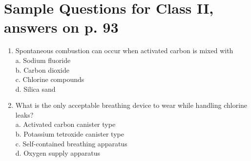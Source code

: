\documentclass[10pt]{article}
\begin{document}
\section{Sample Questions for Class II, answers on p. 93}
\begin{enumerate}
  \item Spontaneous combustion can occur when activated carbon is mixed with\\
a. Sodium fluoride\\
b. Carbon dioxide\\
c. Chlorine compounds\\
d. Silica sand

  \item What is the only acceptable breathing device to wear while handling chlorine leaks?\\
a. Activated carbon canister type\\
b. Potassium tetroxide canister type\\
c. Self-contained breathing apparatus\\
d. Oxygen supply apparatus

\end{enumerate}
\end{document}
